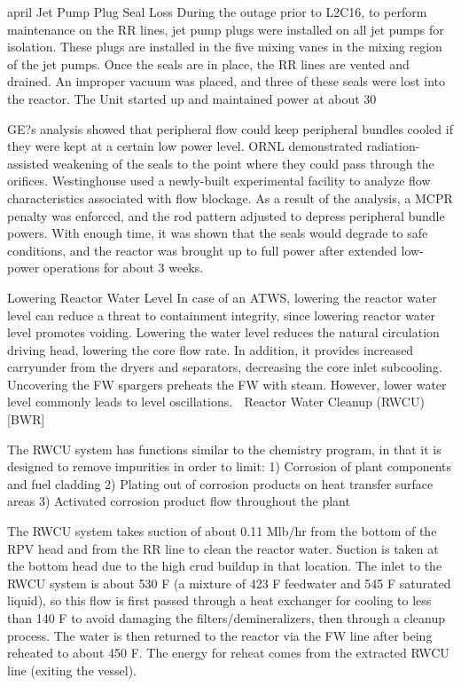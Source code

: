 \documentclass[10pt]{article}
\begin{document}
april Jet Pump Plug Seal Loss
During the outage prior to L2C16, to perform maintenance on the RR lines, jet pump plugs were installed on all jet pumps for isolation. These plugs are installed in the five mixing vanes in the mixing region of the jet pumps. Once the seals are in place, the RR lines are vented and drained. An improper vacuum was placed, and three of these seals were lost into the reactor. The Unit started up and maintained power at about 30%

GE?s analysis showed that peripheral flow could keep peripheral bundles cooled if they were kept at a certain low power level. ORNL demonstrated radiation-assisted weakening of the seals to the point where they could pass through the orifices. Westinghouse used a newly-built experimental facility to analyze flow characteristics associated with flow blockage. As a result of the analysis, a MCPR penalty was enforced, and the rod pattern adjusted to depress peripheral bundle powers. With enough time, it was shown that the seals would degrade to safe conditions, and the reactor was brought up to full power after extended low-power operations for about 3 weeks.

Lowering Reactor Water Level
In case of an ATWS, lowering the reactor water level can reduce a threat to containment integrity, since lowering reactor water level promotes voiding. Lowering the water level reduces the natural circulation driving head, lowering the core flow rate. In addition, it provides increased carryunder from the dryers and separators, decreasing the core inlet subcooling. Uncovering the FW spargers preheats the FW with steam. However, lower water level commonly leads to level oscillations. 
Reactor Water Cleanup (RWCU) [BWR]

The RWCU system has functions similar to the chemistry program, in that it is designed to remove impurities in order to limit:
1)	Corrosion of plant components and fuel cladding
2)	Plating out of corrosion products on heat transfer surface areas
3)	Activated corrosion product flow throughout the plant

The RWCU system takes suction of about 0.11 Mlb/hr from the bottom of the RPV head and from the RR line to clean the reactor water. Suction is taken at the bottom head due to the high crud buildup in that location. The inlet to the RWCU system is about 530 F (a mixture of 423 F feedwater and 545 F saturated liquid), so this flow is first passed through a heat exchanger for cooling to less than 140 F to avoid damaging the filters/demineralizers, then through a cleanup process. The water is then returned to the reactor via the FW line after being reheated to about 450 F. The energy for reheat comes from the extracted RWCU line (exiting the vessel). 
\end{document}
